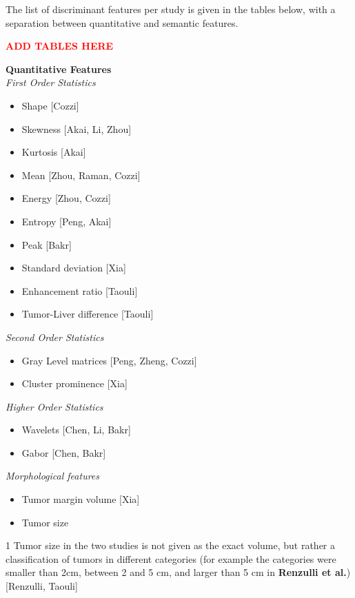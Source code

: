 \documentclass[]{article}
\begin{document}
The list of discriminant features per study is given in the tables
below, with a separation between quantitative and semantic features.


\textcolor{red}{\textbf{ADD TABLES HERE}}



\begin{table}{}
\textbf{Quantitative Features}\\ 
\emph{First Order Statistics}
\begin{itemize}
\item Shape {[}Cozzi{]}
\item Skewness {[}Akai, Li, Zhou{]}
\item Kurtosis {[}Akai{]}
\item Mean {[}Zhou, Raman, Cozzi{]}
\item Energy {[}Zhou, Cozzi{]}
\item Entropy {[}Peng, Akai{]}
\item Peak {[}Bakr{]}
\item Standard deviation {[}Xia{]}
\item Enhancement ratio {[}Taouli{]}
\item Tumor-Liver difference {[}Taouli{]}
\end{itemize} 
\emph{Second Order Statistics} 
\begin{itemize}
\item Gray Level matrices {[}Peng, Zheng, Cozzi{]}
\item Cluster prominence {[}Xia{]}
\end{itemize}
\emph{Higher Order Statistics}
\begin{itemize}
\item Wavelets {[}Chen, Li, Bakr{]}
\item Gabor {[}Chen, Bakr{]}
\end{itemize}
\emph{Morphological features}
\begin{itemize}
\item Tumor margin volume {[}Xia{]}
\item Tumor size
\end{itemize}

\begin{tablenotes}
\item[1] {Tumor size in the two studies is not given as the exact volume, but
rather a classification of tumors in different categories (for example
the categories were smaller than 2cm, between 2 and 5 cm, and larger
than 5 cm in \textbf{Renzulli et al.})} {[}Renzulli, Taouli{]}
\end{tablenotes}
\end{table}
\end{document}
